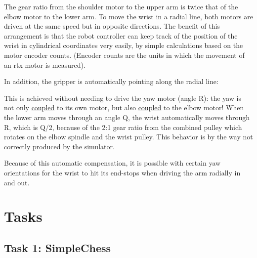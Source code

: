 \documentclass[10pt]{scrartcl}
\begin{document}
\begin{figure}[htbp]
  \centerline{}
  \label{fig:arm2}
\end{figure}
                            
The gear ratio from the shoulder motor to the upper arm is twice that of
the elbow motor to the lower arm. To move the wrist in a radial line,
both motors are driven at the same speed but in opposite directions. The
benefit of this arrangement is that the robot controller can keep track
of the position of the wrist in cylindrical coordinates very easily, by
simple calculations based on the motor encoder counts. (Encoder counts
are the units in which the movement of an rtx motor is measured).

In addition, the gripper is automatically pointing along the radial
line: %

\begin{figure}[htbp]
  \centerline{}
  \label{fig:arm3}
\end{figure}
                                   
This is achieved without needing to drive the yaw motor (angle R): the
yaw is not only \underline{coupled} to its own motor, but also
\underline{coupled} to the elbow motor! When the lower arm moves through
an angle Q, the wrist automatically moves through R, which is Q/2,
because of the 2:1 gear ratio from the combined pulley which rotates on
the elbow spindle and the wrist pulley. This behavior is by the way not
correctly produced by the simulator.

Because of this automatic compensation, it is possible with certain yaw
orientations for the wrist to hit its end-stops when driving the arm
radially in and out.

\section{Tasks}
\label{sec:Tasks}
\subsection{Task 1: SimpleChess}
\label{sec:SimpleChess}


\end{document}
